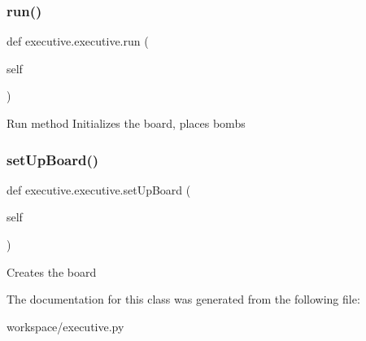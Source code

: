 \subsubsection{\texorpdfstring{run()}{run()}}
{\footnotesize\ttfamily def executive.\+executive.\+run (\begin{DoxyParamCaption}\item[{}]{self }\end{DoxyParamCaption})}

\begin{DoxyVerb}Run method
Initializes the board, places bombs
\end{DoxyVerb}
 \mbox{\label{classexecutive_1_1executive_ae2161d95542ae653323bbfb9ae0ac27b}} 
\subsubsection{\texorpdfstring{set\+Up\+Board()}{setUpBoard()}}
{\footnotesize\ttfamily def executive.\+executive.\+set\+Up\+Board (\begin{DoxyParamCaption}\item[{}]{self }\end{DoxyParamCaption})}

\begin{DoxyVerb}Creates the board
\end{DoxyVerb}
 

The documentation for this class was generated from the following file\+:\begin{DoxyCompactItemize}
\item 
workspace/executive.\+py\end{DoxyCompactItemize}
